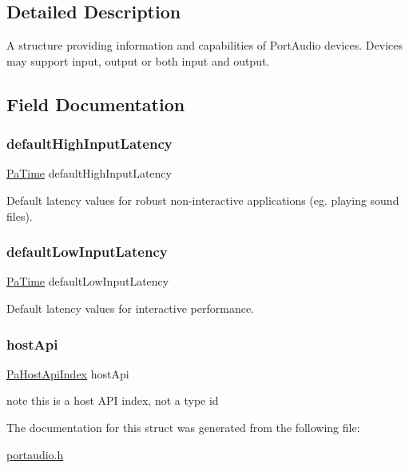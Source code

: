 \subsection{Detailed Description}
A structure providing information and capabilities of Port\+Audio devices. Devices may support input, output or both input and output. 

\subsection{Field Documentation}
\mbox{\label{struct_pa_device_info_a017f8188bac6c71b338b740484ffbf3a}} 
\subsubsection{\texorpdfstring{default\+High\+Input\+Latency}{defaultHighInputLatency}}
{\footnotesize\ttfamily \hyperlink{portaudio_8h_af17a7e6d0471a23071acf8dbd7bbe4bd}{Pa\+Time} default\+High\+Input\+Latency}

Default latency values for robust non-\/interactive applications (eg. playing sound files). \mbox{\label{struct_pa_device_info_a03a1f9f1cd41260fa2112a5fffae4415}} 
\subsubsection{\texorpdfstring{default\+Low\+Input\+Latency}{defaultLowInputLatency}}
{\footnotesize\ttfamily \hyperlink{portaudio_8h_af17a7e6d0471a23071acf8dbd7bbe4bd}{Pa\+Time} default\+Low\+Input\+Latency}

Default latency values for interactive performance. \mbox{\label{struct_pa_device_info_a3d8fc4af88e885df6faf41d1a964fa1c}} 
\subsubsection{\texorpdfstring{host\+Api}{hostApi}}
{\footnotesize\ttfamily \hyperlink{portaudio_8h_aeef6da084c57c70aa94be97411e19930}{Pa\+Host\+Api\+Index} host\+Api}

note this is a host A\+PI index, not a type id 

The documentation for this struct was generated from the following file\+:\begin{DoxyCompactItemize}
\item 
\hyperlink{portaudio_8h}{portaudio.\+h}\end{DoxyCompactItemize}
